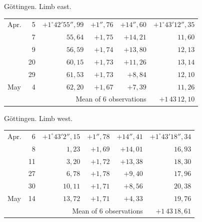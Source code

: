 \noindent\begin{minipage}[t]{.495\textwidth}\centering Göttingen. Limb east.\par\smallskip
{\scriptsize\setlength{\tabcolsep}{1pt}\renewcommand{\arraystretch}{1.2}\begin{tabular}{lr|r|r|r|r|}
Apr.&5&$+1^\circ42'55''{,}99$&$+1''{,}76$&$+14''{,}60$&$+1^\circ43'12''{,}35$\\
&7&$55{,}64$&$+1{,}75$&$+14{,}21$&$11{,}60$\\
&9&$56{,}59$&$+1{,}74$&$+13{,}80$&$12{,}13$\\
&20&$60{,}15$&$+1{,}73$&$+11{,}26$&$13{,}14$\\
&29&$61{,}53$&$+1{,}73$&$+8{,}84$&$12{,}10$\\
May&4&$62{,}20$&$+1{,}67$&$+7{,}39$&$11{,}26$\\
\cline{6-6}\multicolumn{5}{r}{Mean of 6 observations}&$+1\,43\,12{,}10$
\end{tabular}}\end{minipage}\hfill\begin{minipage}[t]{.495\textwidth}\centering Göttingen. Limb west.\par\smallskip
{\scriptsize\setlength{\tabcolsep}{1pt}\renewcommand{\arraystretch}{1.2}\begin{tabular}{lr|r|r|r|r}
Apr.&6&$+1^\circ43'2''{,}15$&$+1''{,}78$&$+14''{,}41$&$+1^\circ43'18''{,}34$\\
&8&$1{,}23$&$+1{,}69$&$+14{,}01$&$16{,}93$\\
&11&$3{,}20$&$+1{,}72$&$+13{,}38$&$18{,}30$\\
&27&$6{,}78$&$+1{,}78$&$+9{,}40$&$17{,}96$\\
&30&$10{,}11$&$+1{,}71$&$+8{,}56$&$20{,}38$\\
May&14&$13{,}72$&$+1{,}71$&$+4{,}33$&$19{,}76$\\
\cline{6-6}\multicolumn{5}{r}{Mean of 6 observations}&$+1\,43\,18{,}61$
\end{tabular}}\end{minipage}
\par\vspace{4mm}

